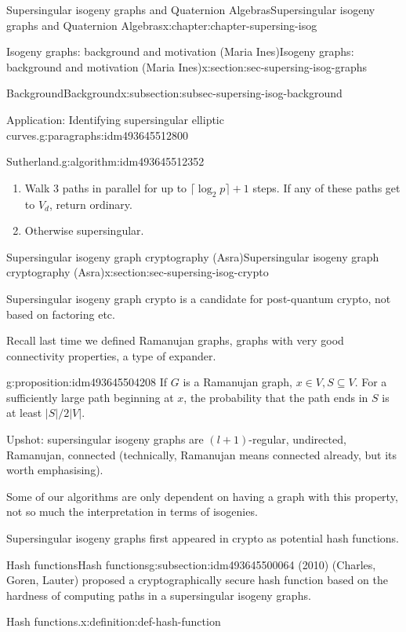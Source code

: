 \documentclass[oneside,10pt,]{book}
\numberwithin{equation}{section}
\begin{document}
\begin{chapterptx}{Supersingular isogeny graphs and Quaternion Algebras}{}{Supersingular isogeny graphs and Quaternion Algebras}{}{}{x:chapter:chapter-supersing-isog}
\begin{sectionptx}{Isogeny graphs: background and motivation (Maria Ines)}{}{Isogeny graphs: background and motivation (Maria Ines)}{}{}{x:section:sec-supersing-isog-graphs}
\begin{subsectionptx}{Background}{}{Background}{}{}{x:subsection:subsec-supersing-isog-background}
\begin{paragraphs}{Application: Identifying supersingular elliptic curves.}{g:paragraphs:idm493645512800}
\begin{algorithm}{Sutherland.}{}{g:algorithm:idm493645512352}
\begin{enumerate}
\item{}Walk 3 paths in parallel for up to \(\lceil \log_2 p \rceil + 1 \) steps. If any of these paths get to \(V_d\), return ordinary.%
\item{}Otherwise supersingular.%
\end{enumerate}
%
\end{algorithm}
\end{paragraphs}%
\end{subsectionptx}
\end{sectionptx}
%
%
\typeout{************************************************}
\typeout{************************************************}
%
\begin{sectionptx}{Supersingular isogeny graph cryptography (Asra)}{}{Supersingular isogeny graph cryptography (Asra)}{}{}{x:section:sec-supersing-isog-crypto}
\begin{introduction}{}%
Supersingular isogeny graph crypto is a candidate for post-quantum crypto, not based on factoring etc.%
\par
Recall last time we defined Ramanujan graphs, graphs with very good connectivity properties, a type of expander.%
\begin{proposition}{}{}{g:proposition:idm493645504208}%
If \(G\) is a Ramanujan graph, \(x\in V, S\subseteq V\). For a sufficiently large path beginning at \(x\), the probability that the path ends in \(S\) is at least \(|S|/2|V|\).%
\end{proposition}
Upshot: supersingular isogeny graphs are \((l +1)\)-regular, undirected, Ramanujan, connected (technically, Ramanujan means connected already, but its worth emphasising).%
\par
Some of our algorithms are only dependent on having a graph with this property, not so much the interpretation in terms of isogenies.%
\par
Supersingular isogeny graphs first appeared in crypto as potential hash functions.%
\end{introduction}%
%
%
\typeout{************************************************}
\typeout{************************************************}
%
\begin{subsectionptx}{Hash functions}{}{Hash functions}{}{}{g:subsection:idm493645500064}
(2010) (Charles, Goren, Lauter) proposed a cryptographically secure hash function based on the hardness of computing paths in a supersingular isogeny graphs.%
\begin{definition}{Hash functions.}{x:definition:def-hash-function}%

\end{definition}
\end{subsectionptx}
\end{sectionptx}
\end{chapterptx}
\end{document}
